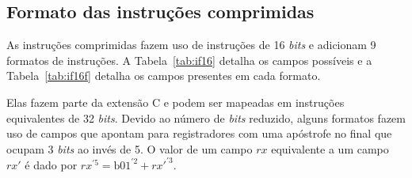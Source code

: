 \subsection{Formato das instruções comprimidas}
\label{sec:instCfmt}

  As instruções comprimidas fazem uso de instruções de 16 \emph{bits} e adicionam 9 formatos de instruções.
  A Tabela~\ref{tab:if16} detalha os campos possíveis e a Tabela~\ref{tab:if16f} detalha os campos 
  presentes em cada formato.

  Elas fazem parte da extensão C e podem ser mapeadas em instruções equivalentes de 32 \emph{bits}. Devido ao 
  número de \emph{bits} reduzido, alguns formatos fazem uso de campos que apontam para registradores com uma 
  apóstrofe no final que ocupam 3 \emph{bits} ao invés de 5. O valor de um campo $rx$ equivalente a um campo $rx'$
  é dado por $rx^{'5} = \text{b}01^{'2} + rx'^{'3}$.



